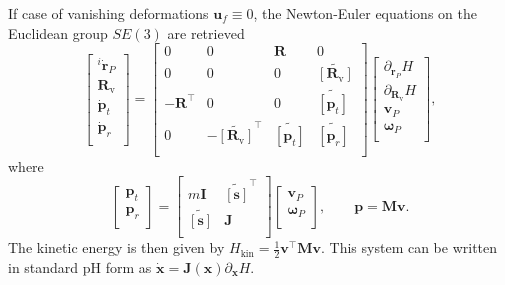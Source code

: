 \documentclass{svjour3}                     %
\newcommand{\crmat}[1]{\ensuremath{\widetilde{\left[#1\right]}}}
\begin{document}
	\begin{remark}
		If case of vanishing deformations $\bm{u}_f \equiv 0$, the Newton-Euler equations on the Euclidean group $SE(3)$ are retrieved \cite{celledoni2018passivity}
		\begin{equation*}
		\begin{bmatrix}
		^i\dot{\bm{r}}_P \\ \bm{R}_{\text{v}} \\\dot{\bm{p}}_t \\ \dot{\bm{p}}_r \\
		\end{bmatrix} = 
		\begin{bmatrix}
		0 & 0 & \bm{R} & 0 \\
		0 & 0 & 0 & \crmat{\bm{R}_{\text{v}}} \\
		- \bm{R}^\top & 0 & 0 & \crmat{\bm{p}_t}\\
		0 & -\crmat{\bm{R}_{\text{v}}}^\top & \crmat{\bm{p}_t} & \crmat{\bm{p}_r} \\
		\end{bmatrix}
		\begin{bmatrix}
		\partial_{\bm{r}_P} H \\ \partial_{\bm{R}_{\text{v}}} H \\ \bm{v}_P \\ \bm{\omega}_P  \\
		\end{bmatrix},
		\end{equation*}
		where
		\begin{equation*}
		\begin{bmatrix}
		\bm{p}_t \\ \bm{p}_r \\ 
		\end{bmatrix} = 
		\begin{bmatrix}
		m \bm{I} & \crmat{\bm{s}}^\top \\
		\crmat{\bm{s}} & \bm{J} \\
		\end{bmatrix}
		\begin{bmatrix}
		\bm{v}_P \\ \bm{\omega}_P  \\ 
		\end{bmatrix}, \qquad \bm{p} = \bm{M} \bm{v}.
		\end{equation*}
		The kinetic energy is then given by $H_{\text{kin}} = \frac{1}{2} \bm{v}^\top \bm{M} \bm{v}$.
		This system can be written in standard pH form as $\dot{\bm{x}} = \bm{J}(\bm{x})\partial_{\bm{x}} H$.
	\end{remark}
	
\end{document}
